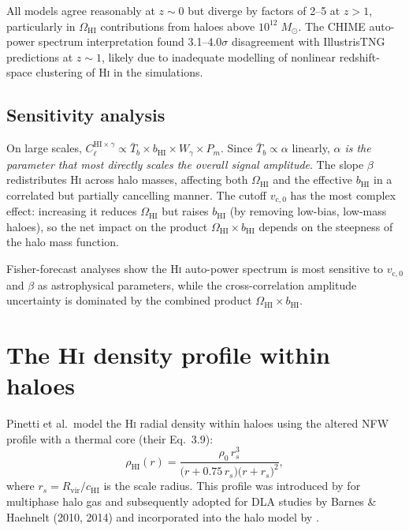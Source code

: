 \documentclass[10pt,a4paper]{article}
\newcommand{\Msun}{M_{\odot}}
\newcommand{\OmHI}{\Omega_{\mathrm{HI}}}
\newcommand{\bHI}{b_{\mathrm{HI}}}
\newcommand{\Tbar}{\bar{T}_b}
\newcommand{\cHI}{c_{\mathrm{HI}}}
\newcommand{\vczero}{v_{\mathrm{c},0}}
\newcommand{\rhoHI}{\rho_{\mathrm{HI}}}
\begin{document}
All models agree reasonably at $z \sim 0$ but diverge by factors of
2--5 at $z > 1$, particularly in $\OmHI$ contributions from haloes above
$10^{12}\;\Msun$.  The CHIME auto-power spectrum interpretation
\citep{CHIME2026} found 3.1--4.0$\sigma$ disagreement with IllustrisTNG
predictions at $z \sim 1$, likely due to inadequate modelling of nonlinear
redshift-space clustering of H\textsc{i} in the simulations.


\subsection{Sensitivity analysis}

On large scales, $C_\ell^{\mathrm{HI}\times\gamma} \propto \Tbar \times \bHI
\times W_\gamma \times P_m$.  Since $\Tbar \propto \alpha$ linearly,
\emph{$\alpha$ is the parameter that most directly scales the overall signal
amplitude}.  The slope $\beta$ redistributes H\textsc{i} across halo masses,
affecting both $\OmHI$ and the effective $\bHI$ in a correlated but partially
cancelling manner.  The cutoff $\vczero$ has the most complex effect:
increasing it reduces $\OmHI$ but raises $\bHI$ (by removing low-bias,
low-mass haloes), so the net impact on the product $\OmHI \times \bHI$ depends
on the steepness of the halo mass function.

Fisher-forecast analyses \citep{Padmanabhan2019} show the H\textsc{i}
auto-power spectrum is most sensitive to $\vczero$ and $\beta$ as
astrophysical parameters, while the cross-correlation amplitude uncertainty
is dominated by the combined product $\OmHI \times \bHI$.


\section{The H\textsc{i} density profile within haloes}
\label{sec:profile}

Pinetti et al.\ model the H\textsc{i} radial density within haloes using the
altered NFW profile with a thermal core (their Eq.~3.9):
\begin{equation}
  \label{eq:rhoHI-profile}
  \boxed{
  \rhoHI(r) = \frac{\rho_0\,r_s^{3}}
  {\bigl(r + 0.75\,r_s\bigr)\bigl(r + r_s\bigr)^{2}},
  }
\end{equation}
where $r_s = R_{\mathrm{vir}}/\cHI$ is the scale radius.  This profile was
introduced by \citet{MallerBullock2004} for multiphase halo gas and
subsequently adopted for DLA studies by Barnes \& Haehnelt (2010, 2014) and
incorporated into the halo model by \citet{Padmanabhan2017}.
\end{document}
